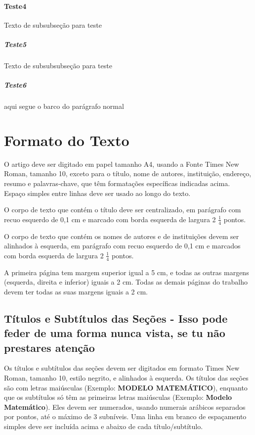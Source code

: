 \documentclass{ufscThesis}
\begin{document}
\subsubsection{Teste4}
Texto de subsubseção para teste

\paragraph{Teste5}
Texto de subsubsubseção para teste

\paragraph{Teste6}

aqui segue o barco do parágrafo normal


\chapter{Formato do Texto}
O artigo deve ser digitado em papel tamanho A4, usando a Fonte Times New Roman, tamanho 10, exceto para o título, nome de autores, instituição, endereço, resumo e palavras-chave, que têm formatações específicas indicadas acima. Espaço simples entre linhas deve ser usado ao longo do texto.

O corpo de texto que contém o título deve ser centralizado, em parágrafo com recuo esquerdo de 0,1 cm e marcado com borda esquerda de largura 2 $\frac{1}{4}$ pontos.

O corpo de texto que contém os nomes de autores e de instituições devem ser alinhados à esquerda, em parágrafo com recuo esquerdo de 0,1 cm e marcados com borda esquerda de largura 2 $\frac{1}{4}$ pontos.

A primeira página tem margem superior igual a 5 cm, e todas as outras margens (esquerda, direita e inferior) iguais a 2 cm. Todas as demais páginas do trabalho devem ter todas as suas margens iguais a 2 cm.

\section{Títulos e Subtítulos das Seções - Isso pode feder de uma forma nunca vista, se tu não prestares atenção}
Os títulos e subtítulos das seções devem ser digitados em formato Times New Roman, tamanho 10, estilo negrito, e alinhados à esquerda. Os títulos das seções são com letras maiúsculas (Exemplo: \textbf{MODELO MATEMÁTICO}), enquanto que os subtítulos só têm as primeiras letras maiúsculas (Exemplo: \textbf{Modelo Matemático}). Eles devem ser numerados, usando numerais arábicos separados por pontos, até o máximo de 3 subníveis. Uma linha em branco de espaçamento simples deve ser incluída acima e abaixo de cada título/subtítulo.
\end{document}
